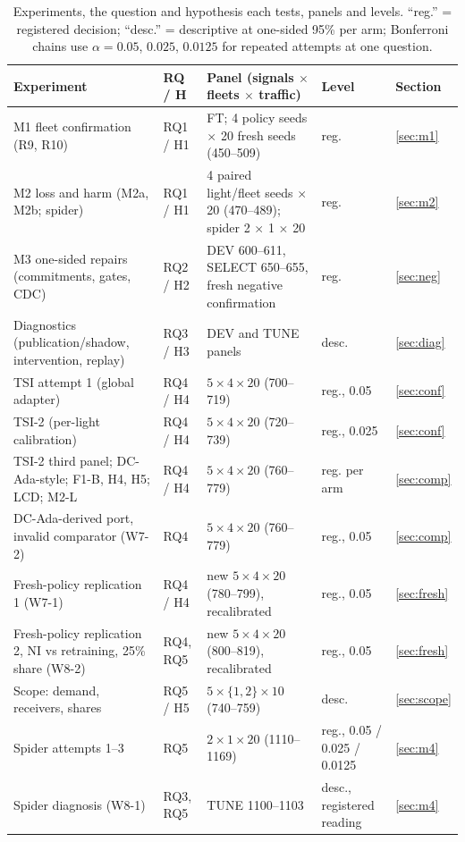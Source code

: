 \begin{table}[t]\centering\footnotesize
\caption{Experiments, the question and hypothesis each tests, panels and levels. ``reg.'' = registered decision; ``desc.'' = descriptive
at one-sided 95\% per arm; Bonferroni chains use $\alpha=0.05$, $0.025$, $0.0125$ for repeated attempts at one question.}\label{tab:expmap}
\begin{tabular}{@{}p{5.3cm}p{1.5cm}p{6.0cm}p{2.5cm}l@{}}\toprule
Experiment & RQ / H & Panel (signals $\times$ fleets $\times$ traffic) & Level & Section\\\midrule
M1 fleet confirmation (R9, R10) & RQ1 / H1 & FT; 4 policy seeds $\times$ 20 fresh seeds (450--509) & reg. & \ref{sec:m1}\\
M2 loss and harm (M2a, M2b; spider) & RQ1 / H1 & 4 paired light/fleet seeds $\times$ 20 (470--489); spider 2 $\times$ 1 $\times$ 20 & reg. & \ref{sec:m2}\\
M3 one-sided repairs (commitments, gates, CDC) & RQ2 / H2 & DEV 600--611, SELECT 650--655, fresh negative confirmation & reg. & \ref{sec:neg}\\
Diagnostics (publication/shadow, intervention, replay) & RQ3 / H3 & DEV and TUNE panels & desc. & \ref{sec:diag}\\
TSI attempt 1 (global adapter) & RQ4 / H4 & $5\times4\times20$ (700--719) & reg., 0.05 & \ref{sec:conf}\\
TSI-2 (per-light calibration) & RQ4 / H4 & $5\times4\times20$ (720--739) & reg., 0.025 & \ref{sec:conf}\\
TSI-2 third panel; DC-Ada-style; F1-B, H4, H5; LCD; M2-L & RQ4 / H4 & $5\times4\times20$ (760--779) & reg. per arm & \ref{sec:comp}\\
DC-Ada-derived port, invalid comparator (W7-2) & RQ4 & $5\times4\times20$ (760--779) & reg., 0.05 & \ref{sec:comp}\\
Fresh-policy replication 1 (W7-1) & RQ4 / H4 & new $5\times4\times20$ (780--799), recalibrated & reg., 0.05 & \ref{sec:fresh}\\
Fresh-policy replication 2, NI vs retraining, 25\% share (W8-2) & RQ4, RQ5 & new $5\times4\times20$ (800--819), recalibrated & reg., 0.05 & \ref{sec:fresh}\\
Scope: demand, receivers, shares & RQ5 / H5 & $5\times\{1,2\}\times10$ (740--759) & desc. & \ref{sec:scope}\\
Spider attempts 1--3 & RQ5 & $2\times1\times20$ (1110--1169) & reg., 0.05 / 0.025 / 0.0125 & \ref{sec:m4}\\
Spider diagnosis (W8-1) & RQ3, RQ5 & TUNE 1100--1103 & desc., registered reading & \ref{sec:m4}\\

\end{tabular}
\end{table}
